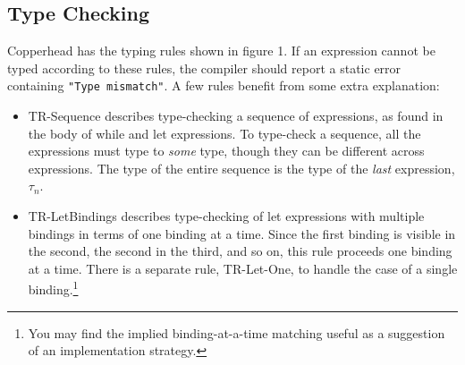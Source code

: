 \documentclass[10pt, oneside]{article}
\begin{document}
\subsection*{Type Checking}

Copperhead has the typing rules shown in figure 1. If an expression cannot be
typed according to these rules, the compiler should report a static error
containing \texttt{"Type mismatch"}. A few rules benefit from some extra
explanation:

\begin{itemize}

\item TR-Sequence describes type-checking a sequence of expressions, as found
in the body of while and let expressions. To type-check a sequence, all the
expressions must type to \emph{some} type, though they can be different
across expressions. The type of the entire sequence is the type of the
\emph{last} expression, $\tau_n$.

\item TR-LetBindings describes type-checking of let expressions with multiple
bindings in terms of one binding at a time. Since the first binding is
visible in the second, the second in the third, and so on, this rule proceeds
one binding at a time. There is a separate rule, TR-Let-One, to handle the
case of a single binding.\footnote{You may find the implied binding-at-a-time
matching useful as a suggestion of an implementation strategy.}



\end{itemize}
\end{document}
